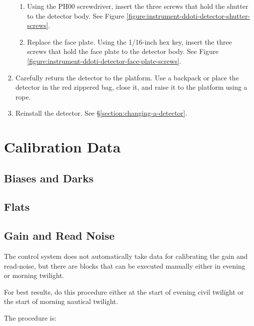 \begin{enumerate}
\begin{enumerate}
\item Using the PH00 screwdriver, insert the three screws that hold the shutter to the detector body. See Figure \ref{figure:instrument-ddoti-detector-shutter-screws}.

\item Replace the face plate. Using the 1/16-inch hex key, insert the three screws that hold the face plate to the detector body. See Figure \ref{figure:instrument-ddoti-detector-face-plate-screws}.

\end{enumerate}

\item Carefully return the detector to the platform. Use a backpack or place the detector in the red zippered bag, close it, and raise it to the platform using a rope.

\item Reinstall the detector. See \S\ref{section:changing-a-detector}.

\end{enumerate}

\section{Calibration Data}

\subsection{Biases and Darks}

\subsection{Flats}

\subsection{Gain and Read Noise}

The control system does not automatically take data for calibrating the gain and read-noise, but there are blocks that can be executed manually either in evening or morning twilight. 

For best results, do this procedure either at the start of evening civil twilight or the start of morning nautical twilight.

The procedure is:

